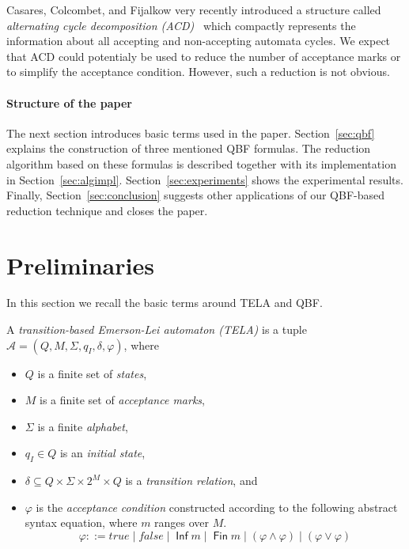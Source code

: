 \documentclass[a4paper,UKenglish,cleveref, autoref, thm-restate]{lipics-v2021}
\DeclareMathOperator{\Inf}{\mathsf{Inf}}
\DeclareMathOperator{\Fin}{\mathsf{Fin}}
\def\false{\mathit{false}}
\def\true{\mathit{true}}
\newcommand{\mA}{\mathcal{A}}
\begin{document}
Casares, Colcombet, and Fijalkow very recently introduced a structure
called \emph{alternating cycle decomposition
  (ACD)}~\cite{casares.21.icalp} which compactly represents the
information about all accepting and non-accepting automata cycles. We
expect that ACD could potentialy be used to reduce the number of
acceptance marks or to simplify the acceptance condition. However,
such a reduction is not obvious.

\paragraph*{Structure of the paper} The next section introduces basic
terms used in the paper. Section~\ref{sec:qbf} explains the
construction of three mentioned QBF formulas. The reduction algorithm
based on these formulas is described together with its implementation
in Section~\ref{sec:algimpl}. Section~\ref{sec:experiments} shows the
experimental results. Finally, Section~\ref{sec:conclusion} suggests
other applications of our QBF-based reduction technique and closes the
paper.


\section{Preliminaries}\label{sec:prelim}

In this section we recall the basic terms around TELA and QBF.

\begin{definition}[TELA]
  A \emph{transition-based Emerson-Lei automaton (TELA)} is a tuple
  $\mA =(Q,M,\Sigma,q_I,\delta,\varphi)$, where
  \begin{itemize}
  \item $Q$ is a finite set of \emph{states},
  \item $M$ is a finite set of \emph{acceptance marks},
  \item $\Sigma$ is a finite \emph{alphabet},
  \item $q_I\in Q$ is an \emph{initial state},
  \item $\delta \subseteq Q \times \Sigma \times 2^{M} \times Q$ is a
    \emph{transition relation}, and
  \item $\varphi$ is the \emph{acceptance condition} constructed
    according to the following abstract syntax equation, where $m$
    ranges over $M$.
    $$\varphi ::= \true \mid \false \mid \Inf m \mid \Fin m \mid \left( \varphi \land \varphi \right) \mid \left( \varphi \lor \varphi \right)$$
\end{itemize}
\end{definition}
\end{document}
